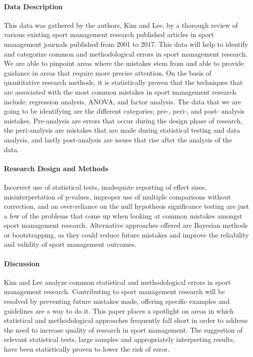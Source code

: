\documentclass[12pt]{article}
\begin{document}
\paragraph{Data Description}
This data was gathered by the authors, Kim and Lee, by a thorough review of various existing sport management research published articles in sport management journals published from 2001 to 2017. This data will help to identify and categorize common and methodological errors in sport management research. We are able to pinpoint areas where the mistakes stem from and able to provide guidance in areas that require more precise attention. On the basis of quantitative research methods, it is statistically proven that the techniques that are associated with the most common mistakes in sport management research include; regression analysis, ANOVA, and factor analysis. The data that we are going to be identifying are the different categories; pre-, peri-, and post- analysis mistakes. Pre-analysis are errors that occur during the design phase of research, the peri-analysis are mistakes that are made during statistical testing and data analysis, and lastly post-analysis are issues that rise after the analysis of the data.

\paragraph{Research Design and Methods}
Incorrect use of statistical tests, inadequate reporting of effect sizes, misinterpretation of p-values, improper use of multiple comparisons without correction, and an over-reliance on the null hypothesis significance testing are just a few of the problems that come up when looking at common mistakes amongst sport management research. Alternative approaches offered are Bayesian methods or bootstrapping, as they could reduce future mistakes and improve the reliability and validity of sport management outcomes.


\paragraph{Discussion} 
Kim and Lee analyze common statistical and methodological errors in sport management research. Contributing to sport management research will be resolved by preventing future mistakes made, offering specific examples and guidelines are a way to do it. This paper places a spotlight on areas in which statistical and methodological approaches frequently fall short in order to address the need to increase quality of research in sport management. The suggestion of relevant statistical tests, large samples and appropriately interpreting results, have been statistically proven to lower the risk of error.




\end{document}
